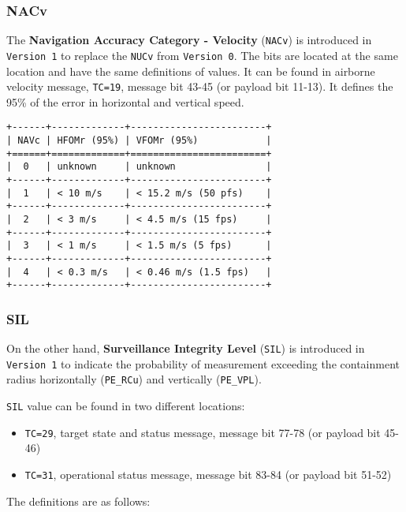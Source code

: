 \subsubsection{NACv}\label{nacv}

The \textbf{Navigation Accuracy Category - Velocity} (\texttt{NACv}) is
introduced in \texttt{Version\ 1} to replace the \texttt{NUCv} from
\texttt{Version\ 0}. The bits are located at the same location and have
the same definitions of values. It can be found in airborne velocity
message, \texttt{TC=19}, message bit 43-45 (or payload bit 11-13). It
defines the 95\% of the error in horizontal and vertical speed.

\begin{verbatim}
+------+-------------+------------------------+
| NAVc | HFOMr (95%) | VFOMr (95%)            |
+======+=============+========================+
|  0   | unknown     | unknown                |
+------+-------------+------------------------+
|  1   | < 10 m/s    | < 15.2 m/s (50 pfs)    |
+------+-------------+------------------------+
|  2   | < 3 m/s     | < 4.5 m/s (15 fps)     |
+------+-------------+------------------------+
|  3   | < 1 m/s     | < 1.5 m/s (5 fps)      |
+------+-------------+------------------------+
|  4   | < 0.3 m/s   | < 0.46 m/s (1.5 fps)   |
+------+-------------+------------------------+
\end{verbatim}

\subsubsection{SIL}\label{sil}

On the other hand, \textbf{Surveillance Integrity Level} (\texttt{SIL})
is introduced in \texttt{Version\ 1} to indicate the probability of
measurement exceeding the containment radius horizontally
(\texttt{PE\_RCu}) and vertically (\texttt{PE\_VPL}).

\texttt{SIL} value can be found in two different locations:

\begin{itemize}

\item
  \texttt{TC=29}, target state and status message, message bit 77-78 (or
  payload bit 45-46)
\item
  \texttt{TC=31}, operational status message, message bit 83-84 (or
  payload bit 51-52)
\end{itemize}

The definitions are as follows:

